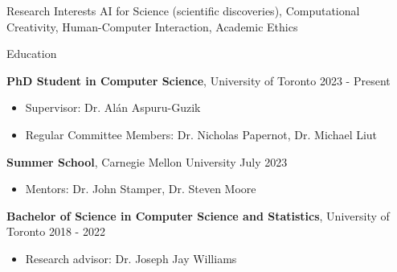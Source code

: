 \documentclass{resume} %
\begin{document}
\begin{rSection}{Research Interests}
    AI for Science (scientific discoveries), Computational Creativity, Human-Computer Interaction, Academic Ethics
\end{rSection}
\begin{rSection}{Education}

    \textbf{PhD Student in Computer Science}, University of Toronto \hfill {2023 - Present}
    \begin{itemize}
        \item Supervisor: Dr. Alán Aspuru-Guzik
        \item Regular Committee Members: Dr. Nicholas Papernot, Dr. Michael Liut
    \end{itemize}
    
    \textbf{Summer School}, Carnegie Mellon University \hfill {July 2023}
    \begin{itemize}
        \item Mentors: Dr. John Stamper, Dr. Steven Moore
    \end{itemize}
    
    \textbf{Bachelor of Science in Computer Science and Statistics}, University of Toronto \hfill {2018 - 2022}
    \begin{itemize}
        \item Research advisor: Dr. Joseph Jay Williams
    \end{itemize}

\end{rSection}
\end{document}
